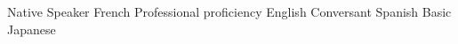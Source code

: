 \begin{cvhonors}
\cvpublication
    {}
    {Native Speaker}
    {}
    {French}
\cvpublication
    {}
    {Professional proficiency}
    {}
    {English}
\cvpublication
    {}
    {Conversant}
    {}
    {Spanish}
\cvpublication
    {}
    {Basic}
    {}
    {Japanese}
\end{cvhonors}


